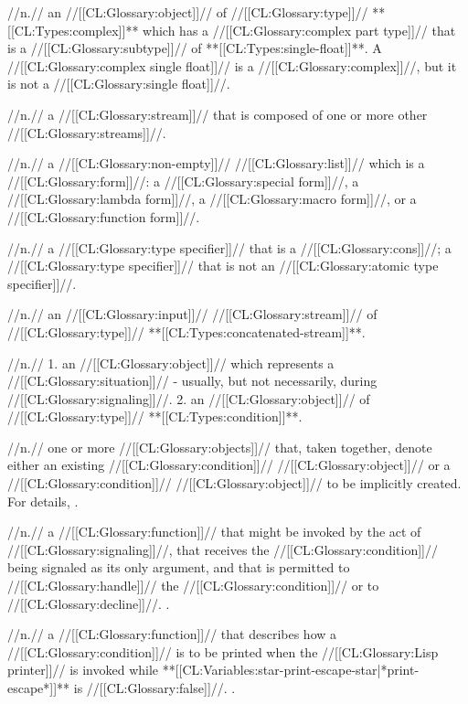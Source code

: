  //n.// an //[[CL:Glossary:object]]// of //[[CL:Glossary:type]]// **[[CL:Types:complex]]** which has a //[[CL:Glossary:complex part type]]// that is a //[[CL:Glossary:subtype]]// of **[[CL:Types:single-float]]**. A //[[CL:Glossary:complex single float]]// is a //[[CL:Glossary:complex]]//, but it is not a //[[CL:Glossary:single float]]//.

 //n.// a //[[CL:Glossary:stream]]// that is composed of one or more other //[[CL:Glossary:streams]]//. 
 
 //n.// a //[[CL:Glossary:non-empty]]// //[[CL:Glossary:list]]// which is a //[[CL:Glossary:form]]//: a //[[CL:Glossary:special form]]//, a //[[CL:Glossary:lambda form]]//, a //[[CL:Glossary:macro form]]//, or a //[[CL:Glossary:function form]]//.

 //n.// a //[[CL:Glossary:type specifier]]// that is a //[[CL:Glossary:cons]]//; \ie a //[[CL:Glossary:type specifier]]// that is not an //[[CL:Glossary:atomic type specifier]]//. 

 //n.// an //[[CL:Glossary:input]]// //[[CL:Glossary:stream]]// of //[[CL:Glossary:type]]// **[[CL:Types:concatenated-stream]]**.

 //n.// 1. an //[[CL:Glossary:object]]// which represents a //[[CL:Glossary:situation]]// - usually, but not necessarily, during //[[CL:Glossary:signaling]]//. 2. an //[[CL:Glossary:object]]// of //[[CL:Glossary:type]]// **[[CL:Types:condition]]**.

 //n.// one or more //[[CL:Glossary:objects]]// that, taken together, denote either an existing //[[CL:Glossary:condition]]// //[[CL:Glossary:object]]// or a //[[CL:Glossary:condition]]// //[[CL:Glossary:object]]// to be implicitly created. For details, \seesection\ConditionDesignators.

 //n.// a //[[CL:Glossary:function]]// that might be invoked by the act of //[[CL:Glossary:signaling]]//, that receives the //[[CL:Glossary:condition]]// being signaled as its only argument, and that is permitted to //[[CL:Glossary:handle]]// the //[[CL:Glossary:condition]]// or to //[[CL:Glossary:decline]]//. \Seesection\Signaling.

 //n.// a //[[CL:Glossary:function]]// that describes how a //[[CL:Glossary:condition]]// is to be printed when the //[[CL:Glossary:Lisp printer]]// is invoked while **[[CL:Variables:star-print-escape-star|*print-escape*]]** is //[[CL:Glossary:false]]//. \Seesection\PrintingConditions.

